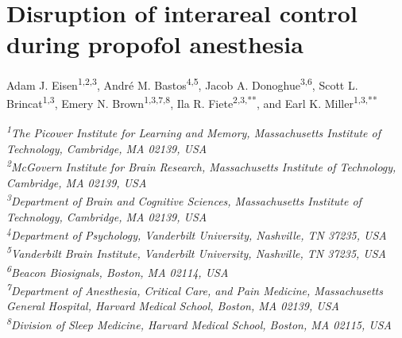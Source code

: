 
\chapter{Disruption of interareal control during propofol anesthesia}
\label{chap:interareal-control}

\begin{center}
{\large
Adam J. Eisen\textsuperscript{1,2,3},
André M. Bastos\textsuperscript{4,5},
Jacob A. Donoghue\textsuperscript{3,6},
Scott L. Brincat\textsuperscript{1,3},
Emery N. Brown\textsuperscript{1,3,7,8},
Ila R. Fiete\textsuperscript{2,3,**},
and Earl K. Miller\textsuperscript{1,3,**}
}

\vspace{0.5em}

{\small\itshape
\textsuperscript{1}The Picower Institute for Learning and Memory, Massachusetts Institute of Technology, Cambridge, MA 02139, USA\\
\textsuperscript{2}McGovern Institute for Brain Research, Massachusetts Institute of Technology, Cambridge, MA 02139, USA\\
\textsuperscript{3}Department of Brain and Cognitive Sciences, Massachusetts Institute of Technology, Cambridge, MA 02139, USA\\
\textsuperscript{4}Department of Psychology, Vanderbilt University, Nashville, TN 37235, USA\\
\textsuperscript{5}Vanderbilt Brain Institute, Vanderbilt University, Nashville, TN 37235, USA\\
\textsuperscript{6}Beacon Biosignals, Boston, MA 02114, USA\\
\textsuperscript{7}Department of Anesthesia, Critical Care, and Pain Medicine, Massachusetts General Hospital, Harvard Medical School, Boston, MA 02139, USA\\
\textsuperscript{8}Division of Sleep Medicine, Harvard Medical School, Boston, MA 02115, USA
}
\end{center}

\vspace{1em}

